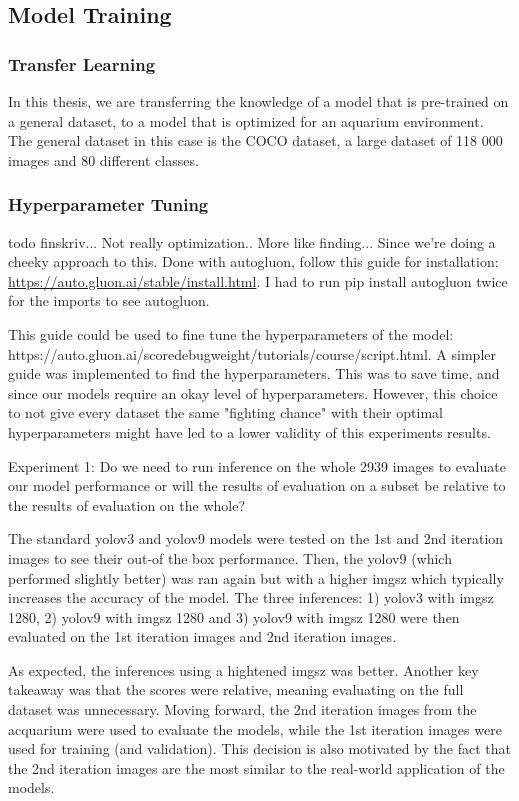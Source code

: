 \subsection{Model Training}
\label{sec:model_training}

\subsubsection{Transfer Learning}
In this thesis, we are transferring the knowledge of a model that is pre-trained on a general dataset, to a model that is optimized for an aquarium environment. The general dataset in this case is the COCO dataset, a large dataset of 118 000 images and 80 different classes.



\subsubsection{Hyperparameter Tuning}
todo finskriv... Not really optimization.. More like finding... Since we're doing a cheeky approach to this. Done with autogluon, follow this guide for installation: \href{AutoGluon guide}{https://auto.gluon.ai/stable/install.html}. I had to run pip install autogluon twice for the imports to see autogluon.

This guide could be used to fine tune the hyperparameters of the model: https://auto.gluon.ai/scoredebugweight/tutorials/course/script.html. A simpler guide was implemented to find the hyperparameters. This was to save time, and since our models require an okay level of hyperparameters. However, this choice to not give every dataset the same "fighting chance" with their optimal hyperparameters might have led to a lower validity of this experiments results.

Experiment 1: Do we need to run inference on the whole 2939 images to evaluate our model performance or will the results of evaluation on a subset be relative to the results of evaluation on the whole?

The standard yolov3 and yolov9 models were tested on the 1st and 2nd iteration images to see their out-of the box performance. Then, the yolov9 (which performed slightly better) was ran again but with a higher imgsz which typically increases the accuracy of the model. The three inferences: 1) yolov3 with imgsz 1280, 2) yolov9 with imgsz 1280 and 3) yolov9 with imgsz 1280 were then evaluated on the 1st iteration images and 2nd iteration images.

As expected, the inferences using a hightened imgsz was better. Another key takeaway was that the scores were relative, meaning evaluating on the full dataset was unnecessary. Moving forward, the 2nd iteration images from the acquarium were used to evaluate the models, while the 1st iteration images were used for training (and validation). This decision is also motivated by the fact that the 2nd iteration images are the most similar to the real-world application of the models.

